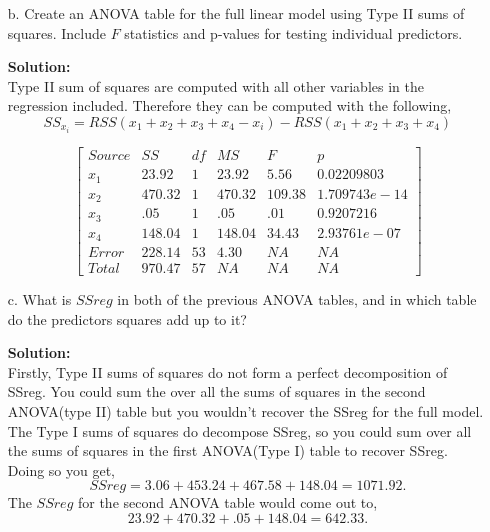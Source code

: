 \documentclass[12pt]{article}
\makeatletter
\theoremstyle{homework}
\newenvironment{exercise}[1]
{\def\@currentlabel{#1}\exercisecore}
{\endexercisecore}
\newcommand{\localhead}[1]{\par\smallskip\noindent\textbf{#1}\nobreak\\}%
\newcommand\solution{\localhead{Solution:}}
\makeatother
\begin{document}
\begin{exercise}{3.}
\begin{enumerate}
    \item[b.] Create an ANOVA table for the full linear model using Type II sums of squares. Include $F$ statistics and p-values 
    for testing individual predictors.\\
    \solution
    Type II sum of squares are computed with all other variables in the regression included. Therefore they can be computed with the following, 
    \begin{equation*}
      SS_{x_i} = RSS(x_1 + x_2 + x_3 + x_4 - x_i) - RSS(x_1 + x_2 + x_3 + x_4)
    \end{equation*}
   
    \begin{equation*}
      \begin{bmatrix}
     Source & SS & df & MS & F & p\\
        x_1 & 23.92   & 1  &  23.92  & 5.56& 0.02209803\\
        x_2 & 470.32& 1 & 470.32 & 109.38&  1.709743e-14\\
        x_3 & .05& 1 & .05 & .01& 0.9207216\\
        x_4 & 148.04& 1 & 148.04 & 34.43& 2.93761e-07\\
      Error & 228.14  & 53 & 4.30 &NA&NA\\ 
      Total & 970.47& 57 & NA &NA&NA 
    \end{bmatrix}
    \end{equation*} 
    \newpage

    \item[c.] What is $SSreg$ in both of the previous ANOVA tables, and in which table do the predictors 
    squares add up to it?\\
    \solution Firstly, Type II sums of squares do not form a perfect decomposition of SSreg. You could sum the 
    over all the sums of squares in the second ANOVA(type II) table but you wouldn't recover the SSreg for the full model. The Type I
    sums of squares do decompose SSreg, so you could sum over all the sums of squares in the first ANOVA(Type I) table to recover SSreg. 
    Doing so you get, 
    \begin{equation*}
      SSreg = 3.06 + 453.24+ 467.58 + 148.04 = 1071.92.
    \end{equation*}
    The $SSreg$ for the second ANOVA table would come out to, 
    \begin{equation*}
      23.92  + 470.32+ .05+ 148.04 = 642.33.
    \end{equation*}
    \newpage
  \end{enumerate}


\end{exercise}
\end{document}
